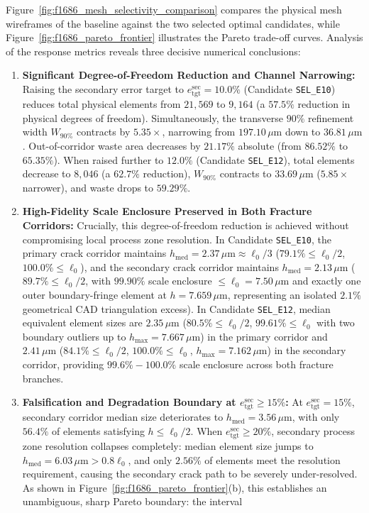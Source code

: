 Figure~\ref{fig:f1686_mesh_selectivity_comparison} compares the physical mesh wireframes of the baseline against the two selected optimal candidates, while Figure~\ref{fig:f1686_pareto_frontier} illustrates the Pareto trade-off curves. Analysis of the response metrics reveals three decisive numerical conclusions:
\begin{enumerate}
  \item \textbf{Significant Degree-of-Freedom Reduction and Channel Narrowing:} Raising the secondary error target to $e_{\mathrm{tgt}}^{\mathrm{sec}} = 10.0\%$ (Candidate \texttt{SEL\_E10}) reduces total physical elements from $21{,}569$ to \textbf{$9{,}164$} (a \textbf{$57.5\%$} reduction in physical degrees of freedom). Simultaneously, the transverse $90\%$ refinement width $W_{90\%}$ contracts by \textbf{$5.35\times$}, narrowing from $197.10\,\mu\mathrm{m}$ down to \textbf{$36.81\,\mu\mathrm{m}$}. Out-of-corridor waste area decreases by $21.17\%$ absolute (from $86.52\%$ to $65.35\%$). When raised further to $12.0\%$ (Candidate \texttt{SEL\_E12}), total elements decrease to \textbf{$8{,}046$} (a \textbf{$62.7\%$} reduction), $W_{90\%}$ contracts to \textbf{$33.69\,\mu\mathrm{m}$} ($5.85\times$ narrower), and waste drops to $59.29\%$.
  \item \textbf{High-Fidelity Scale Enclosure Preserved in Both Fracture Corridors:} Crucially, this degree-of-freedom reduction is achieved without compromising local process zone resolution. In Candidate \texttt{SEL\_E10}, the primary crack corridor maintains $h_{\mathrm{med}} = 2.37\,\mu\mathrm{m} \approx \ell_0/3$ ($79.1\% \le \ell_0/2$, $100.0\% \le \ell_0$), and the secondary crack corridor maintains $h_{\mathrm{med}} = 2.13\,\mu\mathrm{m}$ ($89.7\% \le \ell_0/2$, with $99.90\%$ scale enclosure $\le \ell_0 = 7.50\,\mu\mathrm{m}$ and exactly one outer boundary-fringe element at $h = 7.659\,\mu\mathrm{m}$, representing an isolated $2.1\%$ geometrical CAD triangulation excess). In Candidate \texttt{SEL\_E12}, median equivalent element sizes are $2.35\,\mu\mathrm{m}$ ($80.5\% \le \ell_0/2$, $99.61\% \le \ell_0$ with two boundary outliers up to $h_{\max} = 7.667\,\mu\mathrm{m}$) in the primary corridor and $2.41\,\mu\mathrm{m}$ ($84.1\% \le \ell_0/2$, $100.0\% \le \ell_0$, $h_{\max} = 7.162\,\mu\mathrm{m}$) in the secondary corridor, providing $99.6\% - 100.0\%$ scale enclosure across both fracture branches.
  \item \textbf{Falsification and Degradation Boundary at $e_{\mathrm{tgt}}^{\mathrm{sec}} \ge 15\%$:} At $e_{\mathrm{tgt}}^{\mathrm{sec}} = 15\%$, secondary corridor median size deteriorates to $h_{\mathrm{med}} = 3.56\,\mu\mathrm{m}$, with only $56.4\%$ of elements satisfying $h \le \ell_0/2$. When $e_{\mathrm{tgt}}^{\mathrm{sec}} \ge 20\%$, secondary process zone resolution collapses completely: median element size jumps to $h_{\mathrm{med}} = 6.03\,\mu\mathrm{m} > 0.8\ell_0$, and only $2.56\%$ of elements meet the resolution requirement, causing the secondary crack path to be severely under-resolved. As shown in Figure~\ref{fig:f1686_pareto_frontier}(b), this establishes an unambiguous, sharp Pareto boundary: the interval

\end{enumerate}

